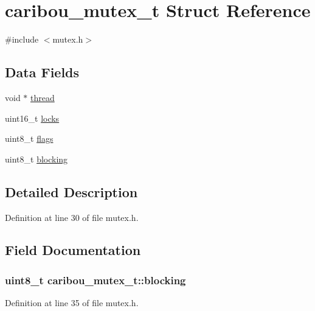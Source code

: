 \hypertarget{structcaribou__mutex__t}{\section{caribou\-\_\-mutex\-\_\-t Struct Reference}
\label{structcaribou__mutex__t}
}


{\ttfamily \#include $<$mutex.\-h$>$}

\subsection*{Data Fields}
\begin{DoxyCompactItemize}
\item 
void $\ast$ \hyperlink{structcaribou__mutex__t_aa286035f1540359f0cd4f0de4a127304}{thread}
\item 
uint16\-\_\-t \hyperlink{structcaribou__mutex__t_ab4553f4d515724806d7f1bc90f8a0872}{locks}
\item 
uint8\-\_\-t \hyperlink{structcaribou__mutex__t_aa263fae88561085ee83fde049b400351}{flags}
\item 
uint8\-\_\-t \hyperlink{structcaribou__mutex__t_a58c4476d2113705569509e239501ae86}{blocking}
\end{DoxyCompactItemize}


\subsection{Detailed Description}


Definition at line 30 of file mutex.\-h.



\subsection{Field Documentation}
\hypertarget{structcaribou__mutex__t_a58c4476d2113705569509e239501ae86}{
\subsubsection[{blocking}]{\setlength{\rightskip}{0pt plus 5cm}uint8\-\_\-t caribou\-\_\-mutex\-\_\-t\-::blocking}}\label{structcaribou__mutex__t_a58c4476d2113705569509e239501ae86}


Definition at line 35 of file mutex.\-h.

